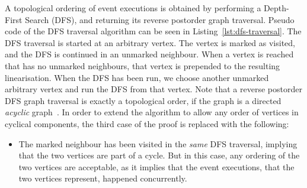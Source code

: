 \documentclass{article}
\begin{document}
	A topological ordering of event executions is obtained by performing a Depth-First Search (DFS), and returning its reverse postorder graph traversal.
	Pseudo code of the DFS traversal algorithm can be seen in Listing~\ref{lst:dfs-traversal}.
	The DFS traversal is started at an arbitrary vertex.
	The vertex is marked as visited, and the DFS is continued in an unmarked neighbour.
	When a vertex is reached that has no unmarked neighbours, that vertex is prepended to the resulting linearisation.
	When the DFS has been run, we choose another unmarked arbitrary vertex and run the DFS from that vertex.
	Note that a reverse postorder DFS graph traversal is exactly a topological order, if the graph is a directed \textit{acyclic} graph~\cite[chapter 4, page 582]{sedgewick_algorithms_2011}.
	In order to extend the algorithm to allow any order of vertices in cyclical components, the third case of the proof is replaced with the following:
	\begin{itemize}
		\item The marked neighbour has been visited in the \textit{same} DFS traversal, implying that the two vertices are part of a cycle.
		But in this case, any ordering of the two vertices are acceptable, as it implies that the event executions, that the two vertices represent, happened concurrently.
	\end{itemize}
\end{document}
